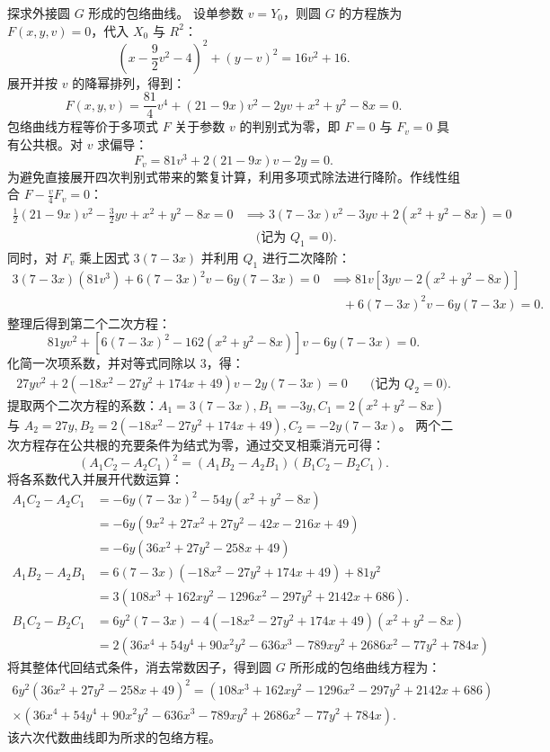\begin{solution}
探求外接圆 $G$ 形成的包络曲线。
设单参数 $v = Y_0$，则圆 $G$ 的方程族为 $F(x,y,v) = 0$，代入 $X_0$ 与 $R^2$：
\[
\left(x - \frac{9}{2}v^2 - 4\right)^2 + (y - v)^2 = 16v^2 + 16.
\]
展开并按 $v$ 的降幂排列，得到：
\[
F(x,y,v) = \frac{81}{4}v^4 + (21 - 9x)v^2 - 2yv + x^2 + y^2 - 8x = 0.
\]
包络曲线方程等价于多项式 $F$ 关于参数 $v$ 的判别式为零，即 $F=0$ 与 $F_v=0$ 具有公共根。对 $v$ 求偏导：
\[
F_v = 81v^3 + 2(21 - 9x)v - 2y = 0.
\]
为避免直接展开四次判别式带来的繁复计算，利用多项式除法进行降阶。作线性组合 $F - \frac{v}{4}F_v = 0$：
\[
\begin{aligned}
\frac{1}{2}(21 - 9x)v^2 - \frac{3}{2}yv + x^2 + y^2 - 8x = 0
&\implies 3(7 - 3x)v^2 - 3yv + 2(x^2 + y^2 - 8x) = 0 \\
&\quad \text{(记为 } Q_1=0 \text{)}.
\end{aligned}
\]
同时，对 $F_v$ 乘上因式 $3(7 - 3x)$ 并利用 $Q_1$ 进行二次降阶：
\[
\begin{aligned}
3(7 - 3x)(81v^3) + 6(7 - 3x)^2 v - 6y(7 - 3x) = 0
&\implies 81v \left[ 3yv - 2(x^2 + y^2 - 8x) \right] \\
&\quad + 6(7 - 3x)^2 v - 6y(7 - 3x) = 0.
\end{aligned}
\]
整理后得到第二个二次方程：
\[
81y v^2 + \left[ 6(7 - 3x)^2 - 162(x^2 + y^2 - 8x) \right] v - 6y(7 - 3x) = 0.
\]
化简一次项系数，并对等式同除以 $3$，得：
\[
\begin{aligned}
27y v^2 + 2( -18x^2 - 27y^2 + 174x + 49 ) v - 2y(7 - 3x) = 0
&\quad \text{(记为 } Q_2=0 \text{)}.
\end{aligned}
\]
提取两个二次方程的系数：$A_1 = 3(7 - 3x), B_1 = -3y, C_1 = 2(x^2 + y^2 - 8x)$ 与 $A_2 = 27y, B_2 = 2( -18x^2 - 27y^2 + 174x + 49 ), C_2 = -2y(7 - 3x)$。
两个二次方程存在公共根的充要条件为结式为零，通过交叉相乘消元可得：
\[
(A_1 C_2 - A_2 C_1)^2 = (A_1 B_2 - A_2 B_1)(B_1 C_2 - B_2 C_1).
\]
将各系数代入并展开代数运算：
\begin{align*}
A_1 C_2 - A_2 C_1 &= -6y(7 - 3x)^2 - 54y(x^2 + y^2 - 8x) \\
&= -6y \left( 9x^2 + 27x^2 + 27y^2 - 42x - 216x + 49 \right) \\
&= -6y(36x^2 + 27y^2 - 258x + 49)\\
A_1 B_2 - A_2 B_1 &= 6(7 - 3x)( -18x^2 - 27y^2 + 174x + 49 ) + 81y^2 \\
&= 3( 108x^3 + 162xy^2 - 1296x^2 - 297y^2 + 2142x + 686 ).\\
B_1 C_2 - B_2 C_1 &= 6y^2(7 - 3x) - 4( -18x^2 - 27y^2 + 174x + 49 )(x^2 + y^2 - 8x) \\
&= 2( 36x^4 + 54y^4 + 90x^2 y^2 - 636x^3 - 789xy^2 + 2686x^2 - 77y^2 + 784x )
\end{align*}
将其整体代回结式条件，消去常数因子，得到圆 $G$ 所形成的包络曲线方程为：
\begin{align*}
6 y^2 (36x^2 + 27y^2 - 258x + 49)^2 = ( 108x^3 + 162xy^2 - 1296x^2 - 297y^2 + 2142x + 686 ) \\
\times ( 36x^4 + 54y^4 + 90x^2 y^2 - 636x^3 - 789xy^2 + 2686x^2 - 77y^2 + 784x ).
\end{align*}
该六次代数曲线即为所求的包络方程。
\end{solution}





